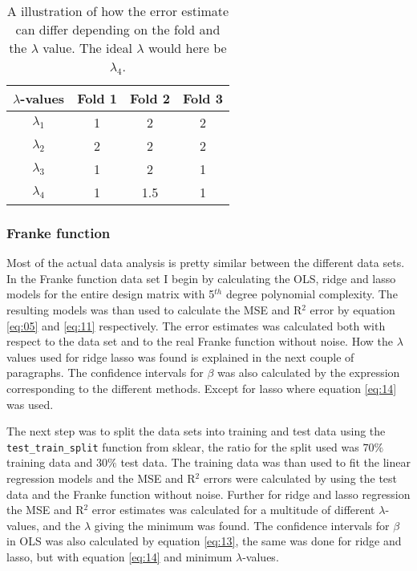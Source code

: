 \documentclass[uio,jmp,amsmath,amssymb,reprint,nofootinbib]{revtex4-1}
\numberwithin{equation}{section}
\begin{document}
\begin{table}
\begin{tabular}{|c|c|c|c|}\hline
\(\lambda\)-values & Fold 1 & Fold 2 & Fold 3 \\ \hline
\(\lambda_{1}\) & 1 & 2 & 2\\ \hline
\(\lambda_{2}\) & 2 & 2 & 2 \\ \hline
\(\lambda_{3}\) & 1 & 2 & 1 \\ \hline
\(\lambda_{4}\) & 1 & 1.5 & 1 \\ \hline
\end{tabular}
\caption{A illustration of how the error estimate can differ depending on the fold and the \(\lambda\) value. The ideal \(\lambda\) would here be \(\lambda_4\).}
\label{tab:01}
\end{table}

\subsubsection{Franke function}

Most of the actual data analysis is pretty similar between the different data sets. 
In the Franke function data set I begin by calculating the OLS, ridge and lasso models for the entire design matrix with 5\(^{th}\) degree polynomial complexity. The resulting models was than used to calculate the MSE and R\(^2\) error by equation \ref{eq:05} and \ref{eq:11} respectively. The error estimates was calculated both with respect to the data set and to the real Franke function without noise. How the \(\lambda\) values used for ridge lasso was found is explained in the next couple of paragraphs. The confidence intervals for \(\beta\) was also calculated by the expression corresponding to the different methods. Except for lasso where equation \ref{eq:14} was used.

The next step was to split the data sets into training and test data using the \texttt{test\_train\_split} function from sklear, the ratio for the split used was \(70\%\) training data and \(30\%\) test data. The training data was than used to fit the linear regression models and the MSE and R\(^2\) errors were calculated by using the test data and the Franke function without noise. Further for ridge and lasso regression the MSE and R\(^2\) error estimates was calculated for a multitude of different \(\lambda\)-values, and the \(\lambda\) giving the minimum was found. The confidence intervals for \(\beta\) in OLS was also calculated by equation \ref{eq:13}, the same was done for ridge and lasso, but with equation \ref{eq:14} and minimum \(\lambda\)-values.
\end{document}
